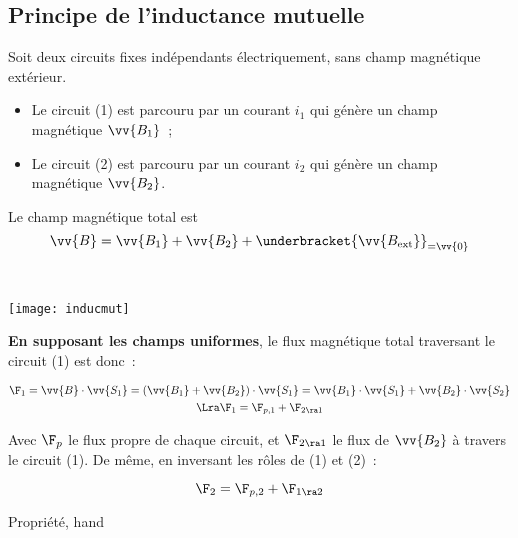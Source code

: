 \documentclass[../main/main.tex]{subfiles}
\begin{document}
\subsection{Principe de l'inductance mutuelle}
\label{ssec:prpeinducmut}
\noindent
\begin{minipage}[t]{.6\linewidth}
  Soit deux circuits fixes indépendants électriquement, sans champ magnétique
  extérieur.
  \begin{itemize}[label=$\diamond$, leftmargin=10pt]
    \item Le circuit (1) est parcouru par un courant $i_1$ qui génère un champ
      magnétique $\vv{B_1}$~;
    \item Le circuit (2) est parcouru par un courant $i_2$ qui génère un champ
      magnétique $\vv{B_2}$.
  \end{itemize}
  Le champ magnétique total est
  \[
    \vv{B} = \vv{B_1} + \vv{B_2} + \underbracket{\vv{B_{\rm ext}}}_{=\vv{0}}
  \]
\end{minipage}
\hfill
\begin{minipage}[t]{.4\linewidth}
  ~
  \vspace*{-20pt}
  \begin{center}
    \texttt{[image: inducmut]}
    \label{fig:inducmut}
  \end{center}
\end{minipage}
\textbf{En supposant les champs uniformes}, le flux magnétique total traversant
le circuit (1) est donc~:
\begin{hide}
  \begin{gather*}
    \F_1 = \vv{B}\cdot \vv{S_1} = \left(\vv{B_1}+\vv{B_2}\right)\cdot \vv{S_1}
    = \vv{B_1}\cdot \vv{S_1}+\vv{B_2}\cdot \vv{S_2}
    \\\Lra 
    \F_1 = \F_{p,1} + \F_{2\ra 1}
  \end{gather*}
\end{hide}
Avec $\F_p$ le flux propre de chaque circuit, et $\F_{2\ra 1}$ le flux de
$\vv{B_2}$ à travers le circuit (1). De même, en inversant les rôles de (1) et
(2)~:
\begin{hide}
  \[
    \F_2 = \F_{p,2} + \F_{1\ra 2}
  \]
\end{hide}

\begin{tprop}{Propriété, hand}
\end{tprop}
\end{document}
